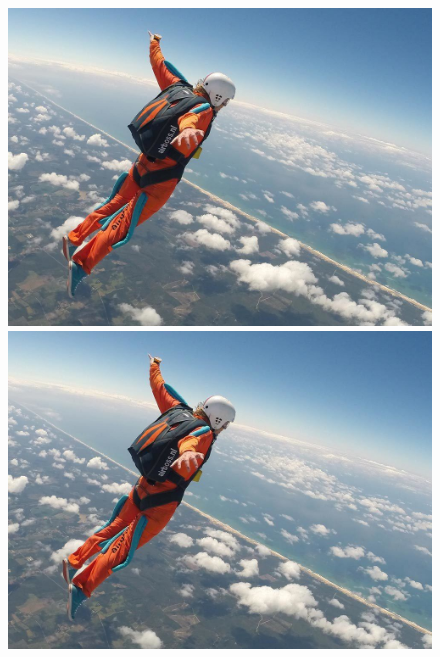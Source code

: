 \documentclass{article}
\begin{document}
\begin{figure}
		\centering
	
		\begin{minipage}[t]{0.4\textwidth}
		\includegraphics[width=\textwidth]{Sky.jpg}
		\end{minipage}	
		\begin{minipage}[t]{0.4\textwidth}		\includegraphics[width=\textwidth]{Sky.jpg}
		\end{minipage}
	
	\end{figure}
\end{document}
